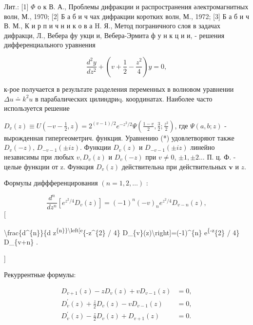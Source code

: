 \documentclass[10pt]{article}
\begin{document}
Лит.: [1] $\Phi$ о к В. А., Проблемы дифракции и распространения әлектромагнитных волн, М., 1970; [2] Б а б и ч чах дифракции коротких волн, М., 1972; [3] Б а б и ч В. М., К и р п и ч н и к о в а H. Я., Метод пограничного слоя в задачах дифракци, Л., Вебера фу укци и, Вебера-Эрмита ф у н к ц и и, - решения дифференциального уравнения



\[

\frac{d^{2} y}{d z^{2}}+\left(v+\frac{1}{2}-\frac{z^{2}}{4}\right) y=0,

\]



к-рое получается в результате разделения переменных в волновом уравнении $\Delta u \doteq k^{2} u$ в парабалических цилиндриq. координатах. Наиболее часто используется решение



$D_{v}(z) \equiv U\left(-v-\frac{1}{2}, z\right)=2^{(v-1) / 2} e^{-z^{2} / 2} \Psi\left(\frac{1-v}{2}, \frac{3}{2} ; \frac{z^{2}}{2}\right)$, где $\Psi(a, b ; z)$ - вырожденная гипергеометрич. функция. Уравнению (*) удовлетворяют также $D_{v}(-z)$, $D_{-v-1}( \pm i z)$. Функции $D_{v}(z)$ и $D_{-v-1}( \pm i z)$ линейно независимы при любых $v, D_{v}(z)$ и $D_{v}(-z)$ при $v \neq 0$, $\pm 1, \pm 2 \ldots$ П. ц. Ф. - целые функции от z. Функция $D_{v}(z)$ действительна при действительных $\boldsymbol{v}$ и $z$.



Формулы диффференцирования $(n=1,2, \ldots)$ :



\[

\frac{d^{n}}{d z^{n}}\left[e^{z^{2} / 4} D_{v}(z)\right]=(-1)^{n}(-v)_{n} e^{z^{2} / 4} D_{v-n}(z),

\][



\textbackslash frac\{d\^{}\{n\}\}\{d z\textsuperscript{\{n\}\}\textbackslash left[e}\{-z\^{}\{2\} / 4\} D\_\{v\}(z)\textbackslash right]=(-1)\^{}\{n\} e\textsuperscript{\{-z}\{2\} / 4\} D\_\{v+n\} .

]



Рекуррентные формулы:



\[

\begin{aligned}

D_{v+1}(z)-z D_{v}(z)+v D_{v-1}(z) & =0, \\

D_{v}^{\prime}(z)+\frac{z}{2} D_{v}(z)-v D_{v-1}(z) & =0, \\

D_{v}^{\prime}(z)-\frac{z}{2} D_{v}(z)+D_{v+1}(z) & =0 .

\end{aligned}

\]
\end{document}
